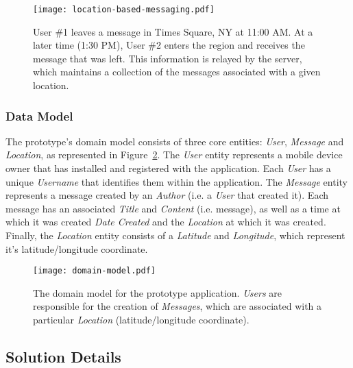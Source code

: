 \documentclass{article}
\begin{document}
\begin{figure}
\begin{center}
\texttt{[image: location-based-messaging.pdf]}
\caption{User \#1 leaves a message in Times Square, NY at 11:00 AM. At a later time (1:30 PM), User \#2 enters the region and receives the message that was left. This information is relayed by the server, which maintains a collection of the messages associated with a given location.}
\label{fig:location_based_messaging}
\end{center}
\end{figure}


\subsubsection{Data Model} %
\label{ssub:data_model}

The prototype's domain model consists of three core entities: \emph{User}, \emph{Message} and \emph{Location}, as represented in Figure~\ref{fig:domain_model}. The \emph{User} entity represents a mobile device owner that has installed and registered with the application. Each \emph{User} has a unique \emph{Username} that identifies them within the application. The \emph{Message} entity represents a message created by an \emph{Author} (i.e. a \emph{User} that created it). Each message has an associated \emph{Title} and \emph{Content} (i.e. message), as well as a time at which it was created \emph{Date Created} and the \emph{Location} at which it was created. Finally, the \emph{Location} entity consists of a \emph{Latitude} and \emph{Longitude}, which represent it's latitude/longitude coordinate.

\begin{figure}
\begin{center}
\texttt{[image: domain-model.pdf]}
\caption{The domain model for the prototype application. \emph{Users} are responsible for the creation of \emph{Messages}, which are associated with a particular \emph{Location} (latitude/longitude coordinate).}
\label{fig:domain_model}
\end{center}
\end{figure}



\subsection{Solution Details} %
\label{sub:solution_details}
\end{document}
